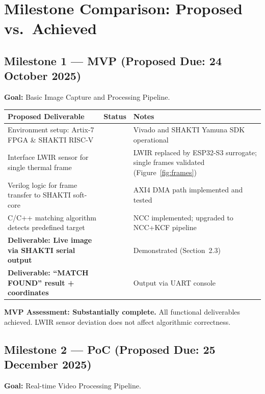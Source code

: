 \documentclass[12pt,a4paper]{article}
\newcommand{\chk}{\textcolor{StatusGreen}{\ding{52}}}
\newcommand{\prt}{\textcolor{StatusAmber}{\ding{119}}}
\begin{document}
\section{Milestone Comparison: Proposed vs.\ Achieved}

\subsection{Milestone 1 --- MVP (Proposed Due: 24 October 2025)}

\textbf{Goal:} Basic Image Capture and Processing Pipeline.

\renewcommand{\arraystretch}{1.4}
\begin{center}
\begin{tabularx}{\linewidth}{L{5.5cm} C{1.6cm} X}
\toprule
{}
\textbf{Proposed Deliverable} & \textbf{Status} & \textbf{Notes} \\
\midrule
Environment setup: Artix-7 FPGA \& SHAKTI RISC-V & \chk & Vivado and SHAKTI Yamuna SDK operational \\
Interface LWIR sensor for single thermal frame & \prt & LWIR replaced by ESP32-S3 surrogate; single frames validated (Figure~\ref{fig:frames}) \\
Verilog logic for frame transfer to SHAKTI soft-core & \chk & AXI4 DMA path implemented and tested \\
C/C++ matching algorithm detects predefined target & \chk & NCC implemented; upgraded to NCC+KCF pipeline \\
\textbf{Deliverable: Live image via SHAKTI serial output} & \chk & Demonstrated (Section~2.3) \\
\textbf{Deliverable: ``MATCH FOUND'' result + coordinates} & \chk & Output via UART console \\
\bottomrule
\end{tabularx}
\end{center}

\medskip
\textbf{MVP Assessment: Substantially complete.} All functional deliverables achieved. LWIR sensor deviation does not affect algorithmic correctness.

\subsection{Milestone 2 --- PoC (Proposed Due: 25 December 2025)}

\textbf{Goal:} Real-time Video Processing Pipeline.
\end{document}
